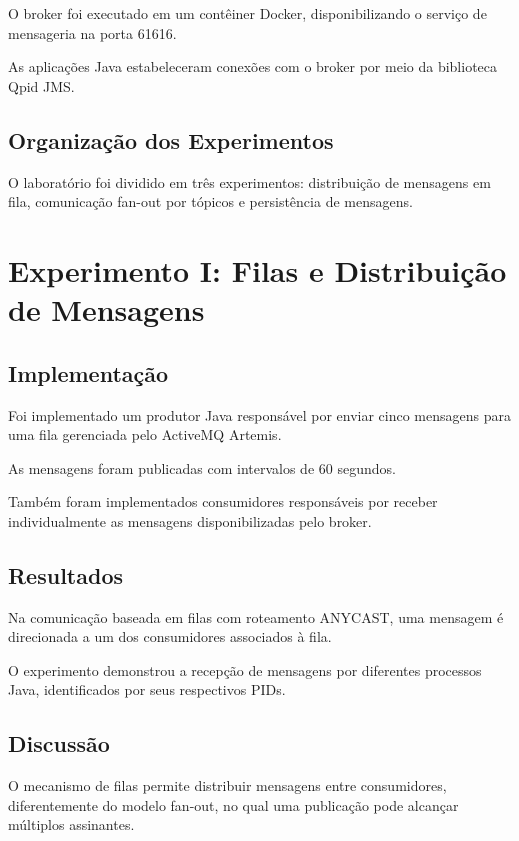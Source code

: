 \documentclass[12pt,a4paper]{article}
\begin{document}
O broker foi executado em um contêiner Docker,
disponibilizando o serviço de mensageria
na porta 61616.

As aplicações Java estabeleceram conexões
com o broker por meio da biblioteca Qpid JMS.

\subsection{Organização dos Experimentos}

O laboratório foi dividido em três experimentos:
distribuição de mensagens em fila, comunicação
fan-out por tópicos e persistência de mensagens.

\section{Experimento I: Filas e Distribuição de Mensagens}

\subsection{Implementação}

Foi implementado um produtor Java responsável
por enviar cinco mensagens para uma fila
gerenciada pelo ActiveMQ Artemis.

As mensagens foram publicadas com intervalos
de 60 segundos.

Também foram implementados consumidores
responsáveis por receber individualmente
as mensagens disponibilizadas pelo broker.

\subsection{Resultados}

Na comunicação baseada em filas com roteamento
ANYCAST, uma mensagem é direcionada a um dos
consumidores associados à fila.

O experimento demonstrou a recepção de mensagens
por diferentes processos Java, identificados
por seus respectivos PIDs.


\subsection{Discussão}

O mecanismo de filas permite distribuir
mensagens entre consumidores, diferentemente
do modelo fan-out, no qual uma publicação
pode alcançar múltiplos assinantes.
\end{document}
